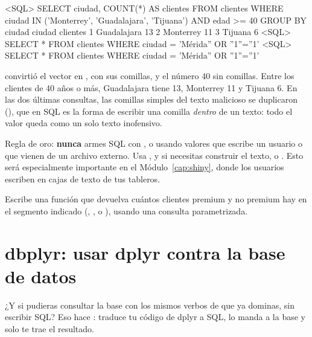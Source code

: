 \begin{rsalida}
<SQL> SELECT ciudad, COUNT(*) AS clientes
FROM clientes
WHERE ciudad IN ('Monterrey', 'Guadalajara', 'Tijuana') AND edad >= 40
GROUP BY ciudad
       ciudad clientes
1 Guadalajara       13
2   Monterrey       11
3     Tijuana        6
<SQL> SELECT * FROM clientes WHERE ciudad = 'Mérida'' OR ''1''=''1'
<SQL> SELECT * FROM clientes WHERE ciudad = 'Mérida'' OR ''1''=''1'
\end{rsalida}

 convirtió el vector  en
, con sus comillas, y el número
40 sin comillas. Entre los clientes de 40 años o más, Guadalajara tiene 13,
Monterrey 11 y Tijuana 6. En las dos últimas consultas, las comillas simples del
texto malicioso se duplicaron (), que en SQL es la forma de
escribir una comilla \emph{dentro} de un texto: todo el valor queda como un
solo texto inofensivo.

\begin{advertencia}
Regla de oro: \textbf{nunca} armes SQL con ,
 o  usando valores que escribe un usuario
o que vienen de un archivo externo. Usa , y si necesitas
construir el texto,  o . Esto
será especialmente importante en el Módulo~\ref{cap:shiny}, donde los
usuarios escriben en cajas de texto de tus tableros.
\end{advertencia}

\begin{hazlotu}
Escribe una función  que
devuelva cuántos clientes premium y no premium hay en el segmento indicado
(, ,  o
), usando una consulta parametrizada.
\end{hazlotu}

\section{dbplyr: usar dplyr contra la base de datos}
\label{sec:m5-dbplyr}

¿Y si pudieras consultar la base con los mismos verbos de 
que ya dominas, sin escribir SQL? Eso hace : traduce tu
código de dplyr a SQL, lo manda a la base y solo te trae el resultado.

